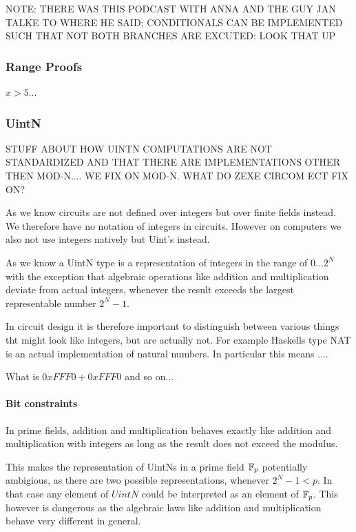 NOTE: THERE WAS THIS PODCAST WITH ANNA AND THE GUY JAN TALKE TO WHERE HE SAID; CONDITIONALS CAN BE IMPLEMENTED SUCH THAT NOT BOTH BRANCHES ARE EXCUTED: LOOK THAT UP

\subsubsection{Range Proofs}
$x>5$...

\subsubsection{UintN}
STUFF ABOUT HOW UINTN COMPUTATIONS ARE NOT STANDARDIZED AND THAT THERE ARE IMPLEMENTATIONS OTHER THEN MOD-N.... WE FIX ON MOD-N. WHAT DO ZEXE CIRCOM ECT FIX ON?

As we know circuits are not defined over integers but over finite fields instead. We therefore have no notation of integers in circuits. However on computers we also not use integers natively but Uint's instead.

As we know a UintN type is a representation of integers in the range of $0 \ldots 2^N$ with the exception that algebraic operations like addition and multiplication deviate from actual integers, whenever the result exceeds the largest representable number $2^N-1$. 

In circuit design it is therefore important to distinguish between various things tht might look like integers, but are actually not. For example Haskells type NAT is an actual implementation of natural numbers. In particular this means ....

\begin{example}[Uint8]
What is $0xFFF0 + 0xFFF0$ and so on...
\end{example}

\paragraph{Bit constraints}
In prime fields, addition and multiplication behaves exactly like addition and multiplication with integers as long as the result does not exceed the modulus. 

This makes the representation of UintNs in a prime field $\mathbb{F}_{p}$ potentially ambigious, as there are two possible representations, whenever $2^N-1 < p$. In that case any element of $UintN$ could be interpreted as an element of $\mathbb{F}_{p}$. This however is dangerous as the algebraic laws like addition and multiplication behave very different in general.  


